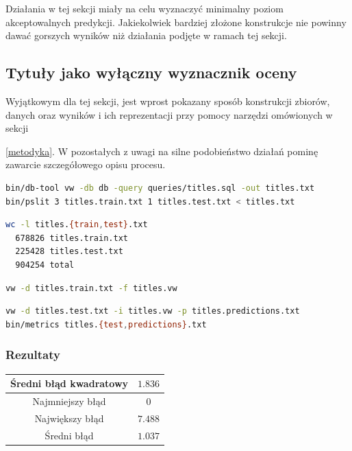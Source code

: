 \documentclass{article}
\newcommand{\sql}[2]{

}
\begin{document}
Działania w tej sekcji miały na celu wyznaczyć minimalny poziom akceptowalnych predykcji. Jakiekolwiek bardziej złożone konstrukcje nie powinny dawać gorszych wyników niż działania podjęte w ramach tej sekcji.

\subsection{Tytuły jako wyłączny wyznacznik oceny} \label{titlesresults}

Wyjątkowym dla tej sekcji, jest wprost pokazany sposób konstrukcji zbiorów, danych oraz wyników i ich reprezentacji przy pomocy narzędzi omówionych w sekcji {\ref{metodyka}. W pozostałych z uwagi na silne podobieństwo działań pominę zawarcie szczegółowego opisu procesu.

\sql{Kwerenda wyznaczająca tytuły filmów oraz ich oceny}{./queries/titles.sql}

\begin{lstlisting}[language=bash,caption=Przygotowanie danych dla modelu i ewaluacji,label=query1]
bin/db-tool vw -db db -query queries/titles.sql -out titles.txt
bin/pslit 3 titles.train.txt 1 titles.test.txt < titles.txt
\end{lstlisting}

\begin{lstlisting}[language=bash,caption=Wielkości zbiorów]
wc -l titles.{train,test}.txt
  678826 titles.train.txt
  225428 titles.test.txt
  904254 total
\end{lstlisting}

\begin{lstlisting}[language=bash, caption=Generowanie modelu]
vw -d titles.train.txt -f titles.vw
\end{lstlisting}

\begin{lstlisting}[language=bash, caption=Ewaluacja modelu]
vw -d titles.test.txt -i titles.vw -p titles.predictions.txt
bin/metrics titles.{test,predictions}.txt
\end{lstlisting}

\subsubsection{Rezultaty}

\begin{center}
\begin{tabular}{ |c|c| }
\hline	Średni błąd kwadratowy & \( 1.836 \) \\
\hline	Najmniejszy błąd & \( 0 \) \\
\hline	Największy błąd & \( 7.488 \) \\
\hline	Średni błąd & \( 1.037 \) \\
\hline
\end{tabular}
\end{center}

}
\end{document}
